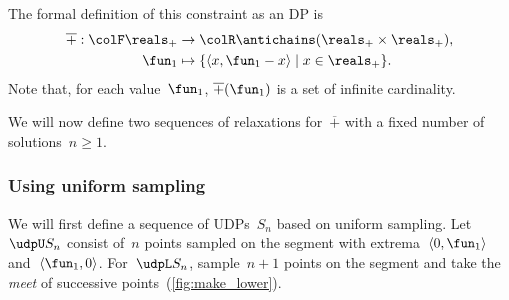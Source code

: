 
The formal definition of this constraint as an DP is
\begin{align*}
    \overline{+}:{\colF\reals_{+}} & \rightarrow{\colR\antichains(\reals_{+}\times\reals_{+})},\\
    \fun_{1} & \mapsto\{\left\langle x,\fun_{1}-x\right\rangle \mid x\in\reals_{+}\}.
\end{align*}
Note that, for each value~$\fun_{1}$, $\overline{+}(\fun_{1})$
is a set of infinite cardinality.

We will now define two sequences of relaxations for~$\overline{+}$
with a fixed number of solutions~$n\geq1$.

\subsubsection*{Using uniform sampling}

We will first define a sequence of UDPs~$S_{n}$ based on uniform
sampling. Let~$\udpU S_{n}$ consist of~$n$ points sampled on the
segment with extrema~$\left\langle 0,\fun_{1}\right\rangle $ and~$\left\langle \fun_{1},0\right\rangle $.
For~$\udpL S_{n}$, sample~$n+1$ points on the segment and take
the \emph{meet} of successive points~(\cref{fig:make_lower}).
\begin{center}
    \par
\end{center}

